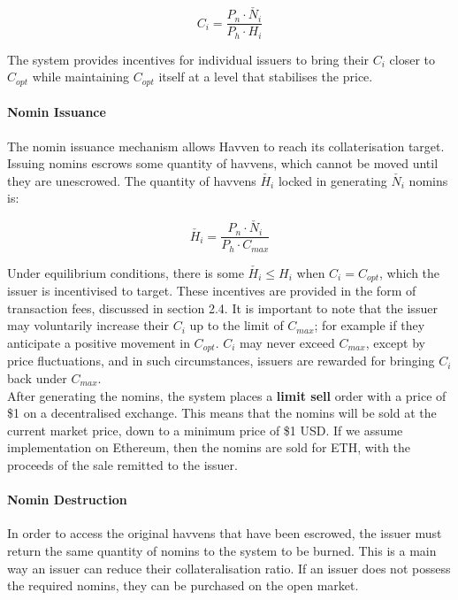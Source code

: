 \begin{equation}
C_i = \frac{P_n \cdot \check{N_i}}{P_h \cdot H_i}  \label{eq:individualcollat}
\end{equation}

\noindent The system provides incentives for individual issuers to bring their $C_i$ closer to $C_{opt}$ while maintaining $C_{opt}$ itself at a level that stabilises the price.

\paragraph{Nomin Issuance}

\noindent The nomin issuance mechanism allows Havven to reach its collaterisation target. Issuing nomins escrows some quantity of havvens, which cannot be moved until they are unescrowed. The quantity of havvens $\check{H_i}$ locked in generating $\check{N_i}$ nomins is:

\begin{equation}
\check{H_i} = \frac{P_n \cdot \check{N_i}}{P_h \cdot C_{max}}  \label{eq:escrowed}
\end{equation}

\noindent Under equilibrium conditions, there is some $\check{H_i} \leq H_i$ when $C_i = C_{opt}$, which the issuer is incentivised to target. These incentives are provided in the form of transaction fees, discussed in section 2.4. It is important to note that the issuer may voluntarily increase their $C_i$ up to the limit of $C_{max}$; for example if they anticipate a positive movement in $C_{opt}$. $C_i$ may never exceed $C_{max}$, except by price fluctuations, and in such circumstances, issuers are rewarded for bringing $C_i$ back under $C_{max}$. \\

\noindent After generating the nomins, the system places a \textbf{limit sell} order with a price of \$1 on a decentralised exchange. This means that the nomins will be sold at the current market price, down to a minimum price of \$1 USD. If we assume implementation on Ethereum, then the nomins are sold for ETH, with the proceeds of the sale remitted to the issuer.

\paragraph{Nomin Destruction}

\noindent In order to access the original havvens that have been escrowed, the issuer must return the same quantity of nomins to the system to be burned. This is a main way 
an issuer can reduce their collateralisation ratio. If an issuer does not possess the required nomins, they can be purchased on the open market.

